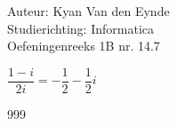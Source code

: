 \documentclass[a4paper]{article}
\begin{document}
  
\noindent \large Auteur: Kyan Van den Eynde \\
\noindent \large Studierichting: Informatica\\
\noindent \large Oefeningenreeks 1B nr. 14.7\\

\medskip

\normalsize

$\dfrac{1-i}{2i} = -\dfrac{1}{2}-\dfrac{1}{2}i$\\

\begin{thebibliography}{999}
\end{thebibliography}
\end{document}
